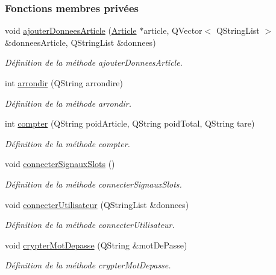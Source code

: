 \subsubsection*{Fonctions membres privées}
\begin{DoxyCompactItemize}
\item 
void \hyperlink{class_supervision_ae6fc43cb8bdfd8045367c08d8e440359}{ajouter\+Donnees\+Article} (\hyperlink{class_article}{Article} $\ast$article, Q\+Vector$<$ Q\+String\+List $>$ \&donnees\+Article, Q\+String\+List \&donnees)
\begin{DoxyCompactList}\small\item\em Définition de la méthode ajouter\+Donnees\+Article. \end{DoxyCompactList}\item 
int \hyperlink{class_supervision_a16fde33340a8bc8b0936926cd6dc0657}{arrondir} (Q\+String arrondire)
\begin{DoxyCompactList}\small\item\em Définition de la méthode arrondir. \end{DoxyCompactList}\item 
int \hyperlink{class_supervision_a81b1b8960cb2857be4a6789cf27cd413}{compter} (Q\+String poid\+Article, Q\+String poid\+Total, Q\+String tare)
\begin{DoxyCompactList}\small\item\em Définition de la méthode compter. \end{DoxyCompactList}\item 
void \hyperlink{class_supervision_ac3bb2f3834b09a81ae9a767502ff693b}{connecter\+Signaux\+Slots} ()
\begin{DoxyCompactList}\small\item\em Définition de la méthode connecter\+Signaux\+Slots. \end{DoxyCompactList}\item 
void \hyperlink{class_supervision_a7c397ca5f79afa2709a657d7185dfbe1}{connecter\+Utilisateur} (Q\+String\+List \&donnees)
\begin{DoxyCompactList}\small\item\em Définition de la méthode connecter\+Utilisateur. \end{DoxyCompactList}\item 
void \hyperlink{class_supervision_ac58c5b922ce85af75c2233cd3265d201}{crypter\+Mot\+Depasse} (Q\+String \&mot\+De\+Passe)
\begin{DoxyCompactList}\small\item\em Définition de la méthode crypter\+Mot\+Depasse. \end{DoxyCompactList}\item 

\end{DoxyCompactItemize}
